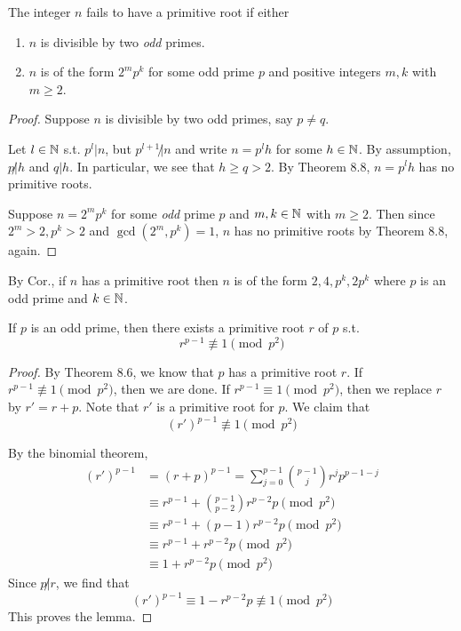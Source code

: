 \begin{corollary}
    The integer $n$ fails to have a primitive root if either
    \begin{enumerate}
        \item $n$ is divisible by two \emph{odd} primes.
        \item $n$ is of the form $2^m p^k$ for some odd prime $p$ and positive
        integers $m, k$ with $m \geq 2$.
    \end{enumerate}
\end{corollary}
\begin{proof}
    Suppose $n$ is divisible by two odd primes, say $p \neq q$.

    Let $l \in \mathbb{N}$ s.t. $p^l | n$, but $p^{l+1} \not| n$ and write $n=p^l h$ for 
    some $h \in \mathbb{N}$. 
    By assumption, $p \not| h$ and $q | h$. 
    In particular, we see that $h \geq q > 2$.
    By Theorem 8.8, $n = p^l h$ has no primitive roots.

    Suppose $n = 2^m p^k$ for some \emph{odd} prime $p$ and $m, k \in \mathbb{N}$ with 
    $m \geq 2$.
    Then since $2^m > 2, p^k > 2$ and $\gcd(2^m, p^k) = 1$, $n$ has no 
    primitive roots by Theorem 8.8, again.
\end{proof}

\begin{remark}
    By Cor., if $n$ has a primitive root then $n$ is of the form $2, 4, p^k, 2p^k$
    where $p$ is an odd prime and $k \in \mathbb{N}$.
\end{remark}
\setcounter{lemma}{0}
\begin{lemma}
    If $p$ is an odd prime, then there exists a primitive root $r$ of $p$ s.t.
    \[
        r^{p-1} \not\equiv 1 \pmod {p^2}
    \]
\end{lemma}
\begin{proof}
    By Theorem 8.6, we know that $p$ has a primitive root $r$.
    If $r^{p-1} \not\equiv 1 \pmod {p^2}$, then we are done.
    If $r^{p-1} \equiv 1 \pmod {p^2}$, then we replace $r$ by
    $r\prime = r + p$. Note that $r\prime$ is a primitive root for $p$.
    We claim that 
    \[
        {(r\prime)}^{p-1} \not\equiv 1 \pmod {p^2}
    \]

    By the binomial theorem,
    \[
        \begin{aligned}
            {(r\prime)}^{p-1} &= {(r + p)}^{p-1} = \sum_{j=0}^{p-1} {p-1 \choose j} r^j p^{p-1-j}\\
            &\equiv r^{p-1} + {p-1 \choose p-2} r^{p-2} p \pmod {p^2}\\
            &\equiv r^{p-1} + (p-1) r^{p-2} p \pmod {p^2}\\
            &\equiv r^{p-1} + r^{p-2} p \pmod {p^2}\\
            &\equiv 1 + r^{p-2} p \pmod {p^2}
        \end{aligned}
    \]
    Since $p \not| r$, we find that
    \[
        (r\prime)^{p-1} \equiv 1 - r^{p-2} p \not\equiv 1 \pmod {p^2}
    \]
    This proves the lemma.
\end{proof}


